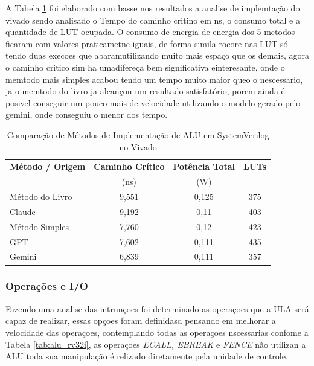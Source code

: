 A Tabela \ref{tab:alu_comparacao} foi elaborado com basse nos resultados a analise de implemtação do vivado sendo analisado o Tempo do caminho critino em ns, o consumo total e a quantidade de LUT ocupada. O consumo de energia de energia dos 5 metodos ficaram com valores praticametne iguais, de forma simila rocore nas LUT só tendo duas execoes que abaramutilizando muito mais espaço que os demais, agora o caminho critico sim ha umadifereça bem significativa  einteresante, onde o memtodo mais simples acabou tendo um tempo muito maior queo o nescessario, ja o memtodo do livro ja alcançou um resultado satisfatório, porem ainda é posivel conseguir um pouco mais de velocidade utilizando o modelo gerado pelo gemini, onde conseguiu o menor dos tempo.



\begin{table}[!htb]
  \centering
  \caption{Comparação de Métodos de Implementação de ALU em SystemVerilog no Vivado}
  \label{tab:alu_comparacao}
  \begin{tabular}{l c c c  }
    \toprule
    \textbf{Método / Origem} & \textbf{Caminho Crítico} & \textbf{Potência Total}  & \textbf{LUTs} \\
                             & (ns)                    & (W)                      &               \\
    \midrule
    Método do Livro          & 9,551                   & 0,125                   & 375            \\
    Claude                   & 9,192                   & 0,11                    & 403             \\
    Método Simples           & 7,760                   & 0,12                    & 423            \\
    GPT                      & 7,602                   & 0,111                   & 435            \\
    Gemini                   & 6,839                  & 0,111                   & 357            \\
    \bottomrule
  \end{tabular}
\end{table}


\subsubsection{Operações e I/O}
\label{subSub:operacoes}

Fazendo uma analise das intrunçoes foi determinado as operaçoes que a ULA será capaz de realizar, essas opçoes foram definidasd pensando em melhorar a velocidade das operaçoes, contemplando todas as operaçoes nscessarias confome a Tabela \ref{tab:alu_rv32i}, as operaçoes \textit{ECALL, EBREAK} e \textit{FENCE} não utilizan a ALU toda sua manipulação é relizado diretamente pela unidade de controle. 


